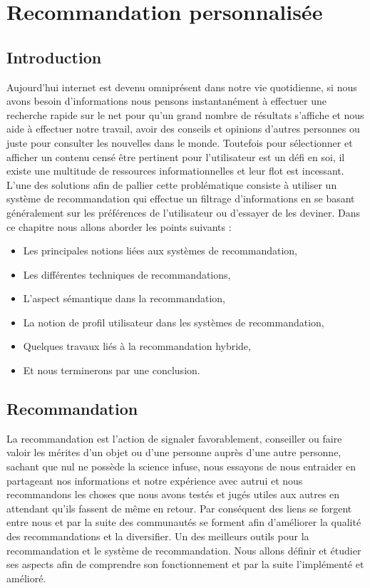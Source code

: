 \documentclass[a4paper,12pt,letterpaper,headsepline,singlespacing,headsepline, french]{report}
\begin{document}
	

	\tableofcontents
	\listoffigures
	\listoftables
	\newpage
	

	\chapter{Recommandation personnalisée}
\thispagestyle{empty}

\newpage


\section{Introduction}

Aujourd'hui internet est devenu omniprésent dans notre vie quotidienne, si nous avons besoin d’informations nous pensons instantanément à effectuer une recherche rapide sur le net pour qu’un grand nombre de résultats s’affiche et nous aide à effectuer notre travail, avoir des conseils et opinions d’autres personnes ou juste pour consulter les nouvelles dans le monde. Toutefois pour sélectionner et afficher un contenu censé être pertinent pour l’utilisateur est un défi en soi, il existe une multitude de ressources informationnelles et leur flot est incessant. L’une des solutions afin de pallier cette problématique consiste à utiliser un système de recommandation qui effectue un filtrage d’informations en se basant généralement sur les préférences de l’utilisateur ou d'essayer de les deviner. 
Dans ce chapitre nous allons aborder les points suivants :
 \begin{itemize}
 	\item	Les principales notions liées aux systèmes de recommandation,
 	\item 	Les différentes techniques de recommandations,
 	\item 	L’aspect sémantique dans la recommandation,
 	\item 	La notion de profil utilisateur dans les systèmes de recommandation,
 	\item 	Quelques travaux liés à la recommandation hybride,
 	\item 	Et nous terminerons par une conclusion.
 \end{itemize}

\section{Recommandation}
La recommandation est l’action de signaler favorablement, conseiller ou faire valoir les mérites d’un objet ou d’une personne auprès d’une autre personne, sachant que nul ne possède la science infuse, nous essayons de nous entraider en partageant nos informations et notre expérience avec autrui et nous recommandons les choses que nous avons testés et jugés utiles aux autres en attendant qu’ils fassent de même en retour. 
Par conséquent des liens se forgent entre nous et par la suite des communautés se forment afin d’améliorer la qualité des recommandations et la diversifier. Un des meilleurs outils pour la recommandation et le système de recommandation. 
Nous allons définir et étudier ses aspects afin de comprendre son fonctionnement et par la suite l'implémenté et amélioré.   
\end{document}
